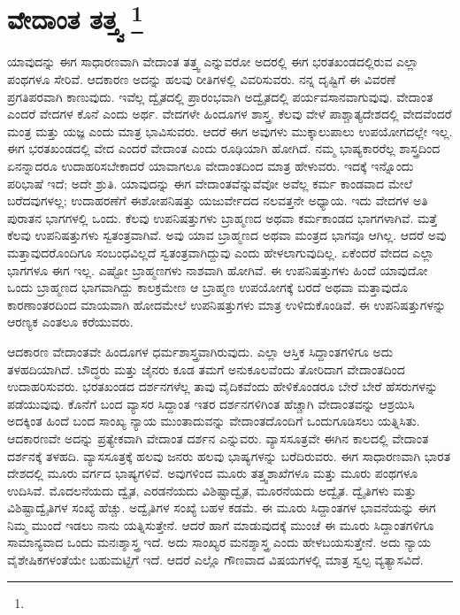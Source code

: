 
\chapter{ವೇದಾಂತ ತತ್ತ್ವ \protect\footnote{}}

ಯಾವುದನ್ನು ಈಗ ಸಾಧಾರಣವಾಗಿ ವೇದಾಂತ ತತ್ತ್ವ ಎನ್ನುವರೋ ಅದರಲ್ಲಿ ಈಗ ಭರತಖಂಡದಲ್ಲಿರುವ ಎಲ್ಲಾ ಪಂಥಗಳೂ ಸೇರಿವೆ. ಆದಕಾರಣ ಅದನ್ನು ಹಲವು ರೀತಿಗಳಲ್ಲಿ ವಿವರಿಸುವರು. ನನ್ನ ದೃಷ್ಟಿಗೆ ಈ ವಿವರಣೆ ಪ್ರಗತಿಪರವಾಗಿ ಕಾಣುವುದು. ಇವೆಲ್ಲ ದ್ವೈತದಲ್ಲಿ ಪ್ರಾರಂಭವಾಗಿ ಅದ್ವೈತದಲ್ಲಿ ಪರ್ಯವಸಾನವಾಗುವುವು. ವೇದಾಂತ ಎಂದರೆ ವೇದಗಳ ಕೊನೆ ಎಂದು ಅರ್ಥ. ವೇದಗಳೇ ಹಿಂದೂಗಳ ಶಾಸ್ತ್ರ. ಕೆಲವು ವೇಳೆ ಪಾಶ್ಚಾತ್ಯದೇಶದಲ್ಲಿ ವೇದವೆಂದರೆ ಮಂತ್ರ ಮತ್ತು ಯಜ್ಞ ಎಂದು ಮಾತ್ರ ಭಾವಿಸುವರು. ಆದರೆ ಈಗ ಅವುಗಳು ಮುಕ್ಕಾಲುಪಾಲು ಉಪಯೋಗದಲ್ಲೇ ಇಲ್ಲ. ಈಗ ಭರತಖಂಡದಲ್ಲಿ ವೇದ ಎಂದರೆ ವೇದಾಂತ ಎಂದು ರೂಢಿಯಾಗಿ ಹೋಗಿದೆ. ನಮ್ಮ ಭಾಷ್ಯಕಾರರೆಲ್ಲ ಶಾಸ್ತ್ರದಿಂದ ಏನನ್ನಾದರೂ ಉದಾಹರಿಸಬೇಕಾದರೆ ಯಾವಾಗಲೂ ವೇದಾಂತದಿಂದ ಮಾತ್ರ ಹೇಳುವರು. ಇದಕ್ಕೆ ಇನ್ನೊಂದು ಪರಿಭಾಷೆ ಇದೆ; ಅದೇ ಶ್ರುತಿ. ಯಾವುದನ್ನು ಈಗ ವೇದಾಂತವೆನ್ನುವೆವೋ ಅವೆಲ್ಲ ಕರ್ಮ ಕಾಂಡವಾದ ಮೇಲೆ ಬರೆದವುಗಳಲ್ಲ; ಉದಾಹರಣೆಗೆ ಈಶೋಪನಿಷತ್ತು ಯಜುರ್ವೇದದ ನಲವತ್ತನೇ ಅಧ್ಯಾಯ. ಇದು ವೇದಗಳ ಅತಿ ಪುರಾತನ ಭಾಗಗಳಲ್ಲಿ ಒಂದು. ಕೆಲವು ಉಪನಿಷತ್ತುಗಳು ಬ್ರಾಹ್ಮಣದ ಅಥವಾ ಕರ್ಮಕಾಂಡದ ಭಾಗಗಳಾಗಿವೆ. ಮತ್ತೆ ಕೆಲವು ಉಪನಿಷತ್ತುಗಳು ಸ್ವತಂತ್ರವಾಗಿವೆ. ಅವು ಯಾವ ಬ್ರಾಹ್ಮಣದ ಅಥವಾ ಮಂತ್ರದ ಭಾಗವೂ ಆಗಿಲ್ಲ. ಆದರೆ ಅವು ಮತ್ತಾವುದರೊಂದಿಗೂ ಸಂಬಂಧವಿಲ್ಲದೆ ಸ್ವತಂತ್ರವಾಗಿದ್ದುವು ಎಂದು ಹೇಳಲಾಗುವುದಿಲ್ಲ. ಏಕೆಂದರೆ ವೇದದ ಎಲ್ಲಾ ಭಾಗಗಳೂ ಈಗ ಇಲ್ಲ. ಎಷ್ಟೋ ಬ್ರಾಹ್ಮಣಗಳು ನಾಶವಾಗಿ ಹೋಗಿವೆ. ಈ ಉಪನಿಷತ್ತುಗಳು ಹಿಂದೆ ಯಾವುದೋ ಒಂದು ಬ್ರಾಹ್ಮಣದ ಭಾಗವಾಗಿದ್ದು ಕಾಲಕ್ರಮೇಣ ಆ ಬ್ರಾಹ್ಮಣ ಉಪಯೋಗಕ್ಕೆ ಬರದೆ ಅಥವಾ ಮತ್ತಾವುದೊ ಕಾರಣಾಂತರದಿಂದ ಮಾಯವಾಗಿ ಹೋದಮೇಲೆ ಉಪನಿಷತ್ತುಗಳು ಮಾತ್ರ ಉಳಿದುಕೊಂಡಿವೆ. ಈ ಉಪನಿಷತ್ತುಗಳನ್ನು ಆರಣ್ಯಕ ಎಂತಲೂ ಕರೆಯುವರು.

ಆದಕಾರಣ ವೇದಾಂತವೇ ಹಿಂದೂಗಳ ಧರ್ಮಶಾಸ್ತ್ರವಾಗಿರುವುದು. ಎಲ್ಲಾ ಆಸ್ತಿಕ ಸಿದ್ದಾಂತಗಳಿಗೂ ಅದು ತಳಹದಿಯಾಗಿದೆ. ಬೌದ್ಧರು ಮತ್ತು ಜೈನರು ಕೂಡ ತಮಗೆ ಅನುಕೂಲವೆಂದು ತೋರಿದಾಗ ವೇದಾಂತದಿಂದ ಉದಾಹರಿಸುವರು. ಭರತಖಂಡದ ದರ್ಶನಗಳೆಲ್ಲ ತಾವು ವೈದಿಕವೆಂದು ಹೇಳಿಕೊಂಡರೂ ಬೇರೆ ಬೇರೆ ಹೆಸರುಗಳನ್ನು ಪಡೆಯುವುವು. ಕೊನೆಗೆ ಬಂದ ವ್ಯಾಸರ ಸಿದ್ದಾಂತ ಇತರ ದರ್ಶನಗಳಿಗಿಂತ ಹೆಚ್ಚಾಗಿ ವೇದಾಂತವನ್ನು ಆಶ್ರಯಿಸಿ ಅದಕ್ಕಿಂತ ಹಿಂದೆ ಬಂದ ಸಾಂಖ್ಯ ನ್ಯಾಯ ಮುಂತಾದುವನ್ನು ವೇದಾಂತದೊಂದಿಗೆ ಒಂದುಗೂಡಿಸಲು ಯತ್ನಿಸಿತು. ಆದಕಾರಣವೇ ಅದನ್ನು ಪ್ರತ್ಯೇಕವಾಗಿ ವೇದಾಂತ ದರ್ಶನ ಎನ್ನುವರು. ವ್ಯಾಸಸೂತ್ರವೇ ಈಗಿನ ಕಾಲದಲ್ಲಿ ವೇದಾಂತ ದರ್ಶನಕ್ಕೆ ತಳಹದಿ. ವ್ಯಾಸಸೂತ್ರಕ್ಕೆ ಹಲವು ಜನರು ಹಲವು ಭಾಷ್ಯಗಳನ್ನು ಬರೆದಿರುವರು. ಈಗ ಸಾಧಾರಣವಾಗಿ ಭಾರತ ದೇಶದಲ್ಲಿ ಮೂರು ವರ್ಗದ ಭಾಷ್ಯಗಳಿವೆ. ಅವುಗಳಿಂದ ಮೂರು ತತ್ತ್ವಶಾಖೆಗಳೂ ಮತ್ತು ಮೂರು ಪಂಥಗಳೂ ಉದಿಸಿವೆ. ಮೊದಲನೆಯದು ದ್ವೈತ, ಎರಡನೆಯದು ವಿಶಿಷ್ಟಾದ್ವೈತ, ಮೂರನೆಯದು ಅದ್ವೈತ. ದ್ವೈತಿಗಳು ಮತ್ತು ವಿಶಿಷ್ಟಾದ್ವೈತಿಗಳ ಸಂಖ್ಯೆ ಹೆಚ್ಚು. ಅದ್ವೈತಿಗಳ ಸಂಖ್ಯೆ ಬಹಳ ಕಡಮೆ. ಈ ಮೂರು ಸಿದ್ದಾಂತಗಳ ಭಾವನೆಯನ್ನು ಈಗ ನಿಮ್ಮ ಮುಂದೆ ಇಡಲು ನಾನು ಯತ್ನಿಸುತ್ತೇನೆ. ಆದರೆ ಹಾಗೆ ಮಾಡುವುದಕ್ಕೆ ಮುಂಚೆ ಈ ಮೂರು ಸಿದ್ದಾಂತಗಳಿಗೂ ಸಾಮಾನ್ಯವಾದ ಒಂದು ಮನಃಶ್ಶಾಸ್ತ್ರ ಇದೆ. ಅದು ಸಾಂಖ್ಯರ ಮನಶ್ಶಾಸ್ತ್ರ ಎಂದು ಹೇಳಬಯಸುತ್ತೇನೆ. ಅದು ನ್ಯಾಯ ವೈಶೇಷಿಕಗಳಂತೆಯೇ ಬಹುಮಟ್ಟಿಗೆ ಇದೆ. ಆದರೆ ಎಲ್ಲೊ ಗೌಣವಾದ ವಿಷಯಗಳಲ್ಲಿ ಮಾತ್ರ ಸ್ವಲ್ಪ ವ್ಯತ್ಯಾಸವಿದೆ.

